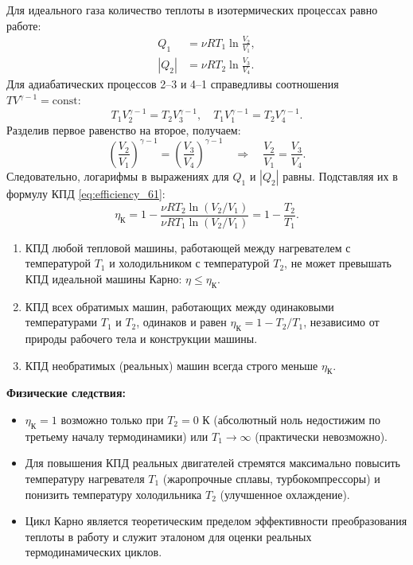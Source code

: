 \begin{theorem}
Для идеального газа количество теплоты в изотермических процессах равно работе:
\begin{align}
    Q_1 &= \nu R T_1 \ln\frac{V_2}{V_1}, \\
    |Q_2| &= \nu R T_2 \ln\frac{V_3}{V_4}.
\end{align}
Для адиабатических процессов 2--3 и 4--1 справедливы соотношения $TV^{\gamma-1} = \text{const}$:
\begin{equation}
    T_1 V_2^{\gamma-1} = T_2 V_3^{\gamma-1}, \quad T_1 V_1^{\gamma-1} = T_2 V_4^{\gamma-1}.
\end{equation}
Разделив первое равенство на второе, получаем:
\begin{equation}
    \left(\frac{V_2}{V_1}\right)^{\gamma-1} = \left(\frac{V_3}{V_4}\right)^{\gamma-1} \quad \Rightarrow \quad \frac{V_2}{V_1} = \frac{V_3}{V_4}.
\end{equation}
Следовательно, логарифмы в выражениях для $Q_1$ и $|Q_2|$ равны. Подставляя их в формулу КПД \eqref{eq:efficiency_61}:
\begin{equation}
    \eta_{\text{К}} = 1 - \frac{\nu R T_2 \ln(V_2/V_1)}{\nu R T_1 \ln(V_2/V_1)} = 1 - \frac{T_2}{T_1}. \label{eq:carnot_eff_61}
\end{equation}
\end{theorem}

\begin{theorem}
\begin{enumerate}
    \item КПД любой тепловой машины, работающей между нагревателем с температурой $T_1$ и холодильником с температурой $T_2$, не может превышать КПД идеальной машины Карно: $\eta \le \eta_{\text{К}}$.
    \item КПД всех обратимых машин, работающих между одинаковыми температурами $T_1$ и $T_2$, одинаков и равен $\eta_{\text{К}} = 1 - T_2/T_1$, независимо от природы рабочего тела и конструкции машины.
    \item КПД необратимых (реальных) машин всегда строго меньше $\eta_{\text{К}}$.
\end{enumerate}
\end{theorem}

\begin{remark}
\textbf{Физические следствия:}
\begin{itemize}
    \item $\eta_{\text{К}} = 1$ возможно только при $T_2 = 0$ К (абсолютный ноль недостижим по третьему началу термодинамики) или $T_1 \to \infty$ (практически невозможно).
    \item Для повышения КПД реальных двигателей стремятся максимально повысить температуру нагревателя $T_1$ (жаропрочные сплавы, турбокомпрессоры) и понизить температуру холодильника $T_2$ (улучшенное охлаждение).
    \item Цикл Карно является теоретическим пределом эффективности преобразования теплоты в работу и служит эталоном для оценки реальных термодинамических циклов.
\end{itemize}
\end{remark}
